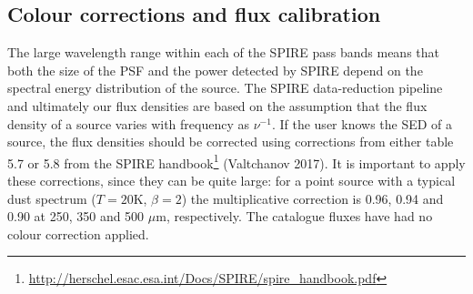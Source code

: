 \documentclass[a4paper,fleqn,usenatbib, twocolumn]{aastex61}
\begin{document}



\subsection{Colour corrections and flux calibration}

The large wavelength range within each of the SPIRE pass bands means
that both the size of the PSF and the power detected by SPIRE depend
on the spectral energy distribution of the source.  The SPIRE
data-reduction pipeline and ultimately our flux densities are based on
the assumption that the flux density of a source varies with frequency
as $\nu^{-1}$.  If the user knows the SED of a source, the flux
densities should be corrected using corrections from either table 5.7
or 5.8 from the SPIRE
handbook\footnote{\url{http://herschel.esac.esa.int/Docs/SPIRE/spire\_handbook.pdf}}
(Valtchanov 2017). It is important to apply these corrections, since
they can be quite large: for a point source with a typical dust
spectrum ($T=20$K, $\beta=2$) the multiplicative correction is 0.96,
0.94 and 0.90 at 250, 350 and 500 $\mu$m, respectively. The catalogue
fluxes have had no colour correction applied.
\end{document}
